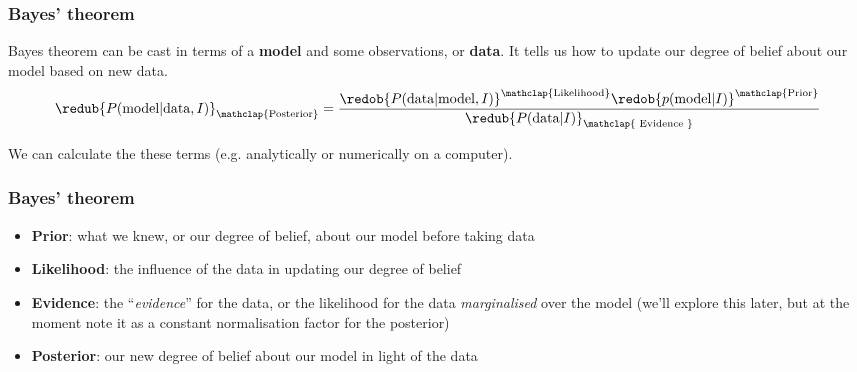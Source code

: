 \begin{frame}

\frametitle{Bayes' theorem}
\label{bayestheorem}

Bayes theorem can be cast in terms of a \textbf{model} and some observations, or \textbf{data}. It tells us
how to update our degree of belief about our model based on new data.
\[
\redub{P(\text{model}|\text{data},I)}_{\mathclap{\text{Posterior}}} = 
\frac{\redob{P(\text{data}|\text{model},I)}^{\mathclap{\text{Likelihood}}} 
\redob{p(\text{model}|I)}^{\mathclap{\text{Prior}}}}{\redub{P(\text{data}|I)}_{\mathclap{\text{
Evidence } } } }
\]

We can calculate the these terms (e.g. analytically or numerically on a computer). 

\end{frame}

\begin{frame}

\frametitle{Bayes' theorem}
\label{bayestheorem}

\begin{itemize}
\item \textbf{Prior}: what we knew, or our degree of belief, about our model before taking data

\item \textbf{Likelihood}: the influence of the data in updating our degree of belief

\item \textbf{Evidence}: the ``\emph{evidence}'' for the data, or the likelihood for the data \emph{marginalised} over
the model (we'll explore this later, but at the moment note it as a constant normalisation factor
for the posterior)

\item \textbf{Posterior}: our new degree of belief about our model in light of the data

\end{itemize}

\end{frame}

